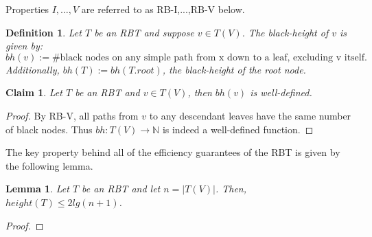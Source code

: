 \documentclass[10pt]{article}
\newtheorem{lemma}{Lemma}[section]
\newtheorem{definition}{Definition}[section]
\newtheorem{claim}{Claim}[section]
\begin{document}
Properties $I,\ldots, V$ are referred to as RB-I,...,RB-V below.

\begin{definition}
  Let $T$ be an RBT and suppose $v \in T(V)$. The \emph{black-height} of
  $v$ is given by:
    \[ bh(v) := \#\text{black nodes on any simple path from x down to a leaf,
      excluding v itself.} \]
  Additionally, $bh(T) := bh(T.root)$, the black-height of the root node.
\end{definition}

\begin{claim}
  Let $T$ be an RBT and $v \in T(V)$, then $bh(v)$ is \emph{well-defined}.
\end{claim}

\begin{proof}
  By RB-V, all paths from $v$ to any descendant leaves
  have the same number of black nodes.
  Thus $bh : T(V) \rightarrow \mathbb{N}$ is indeed a well-defined function.
\end{proof}

The key property behind all of the efficiency guarantees of the RBT is
given by the following lemma.

\begin{lemma}
  \label{rbt-height}
  Let $T$ be an RBT and let $n = |T(V)|$. Then, $height(T) \leq 2lg(n + 1)$.
\end{lemma}

\begin{proof}

\end{proof}
\end{document}
